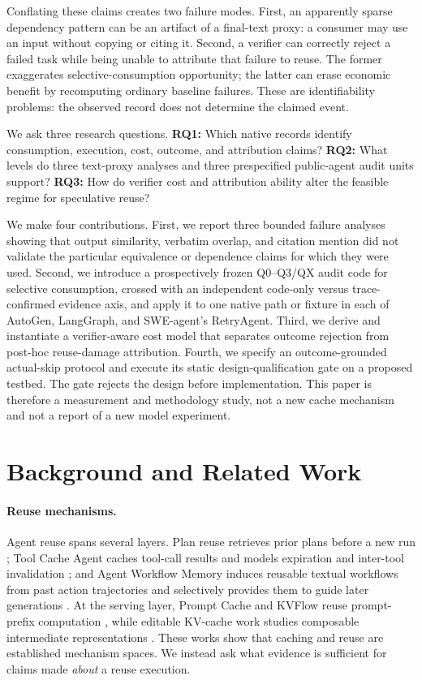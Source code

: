 \documentclass[letterpaper]{article} %
\begin{document}
Conflating these claims creates two failure modes. First, an apparently sparse
dependency pattern can be an artifact of a final-text proxy: a consumer may
use an input without copying or citing it. Second, a verifier can correctly
reject a failed task while being unable to attribute that failure to reuse.
The former exaggerates selective-consumption opportunity; the latter can erase
economic benefit by recomputing ordinary baseline failures. These are
identifiability problems: the observed record does not determine the claimed
event.

We ask three research questions. \textbf{RQ1:} Which native records identify
consumption, execution, cost, outcome, and attribution claims? \textbf{RQ2:}
What levels do three text-proxy analyses and three prespecified public-agent
audit units support? \textbf{RQ3:} How do verifier cost and attribution ability
alter the feasible regime for speculative reuse?

We make four contributions. First, we report three bounded failure analyses
showing that output similarity, verbatim overlap, and citation mention did not
validate the particular equivalence or dependence claims for which they were
used. Second, we introduce a prospectively frozen Q0--Q3/QX audit code for
selective consumption, crossed with an independent code-only versus
trace-confirmed evidence axis, and apply it to one native path or fixture in
each of AutoGen, LangGraph, and SWE-agent's RetryAgent. Third, we derive and
instantiate a verifier-aware cost model that separates outcome rejection from
post-hoc reuse-damage attribution. Fourth, we specify an outcome-grounded
actual-skip protocol and execute its static design-qualification gate on a
proposed testbed.
The gate rejects the design before implementation. This paper is therefore a
measurement and methodology study, not a new cache mechanism and not a report
of a new model experiment.

\section{Background and Related Work}

\paragraph{Reuse mechanisms.}
Agent reuse spans several layers. Plan reuse retrieves prior plans before a
new run \cite{agentreuse2024}; Tool Cache Agent caches tool-call results and
models expiration and inter-tool invalidation \cite{toolcacheagent2026}; and
Agent Workflow Memory induces reusable textual workflows from past action
trajectories and selectively provides them to guide later generations
\cite{agentWorkflowMemory2025}. At the serving layer,
Prompt Cache and KVFlow reuse prompt-prefix computation
\cite{promptcache2024,kvflow2025}, while editable KV-cache work studies
composable intermediate representations \cite{prefillnotes2026}. These works
show that caching and reuse are established mechanism spaces. We instead ask
what evidence is sufficient for claims made \emph{about} a reuse execution.
\end{document}

